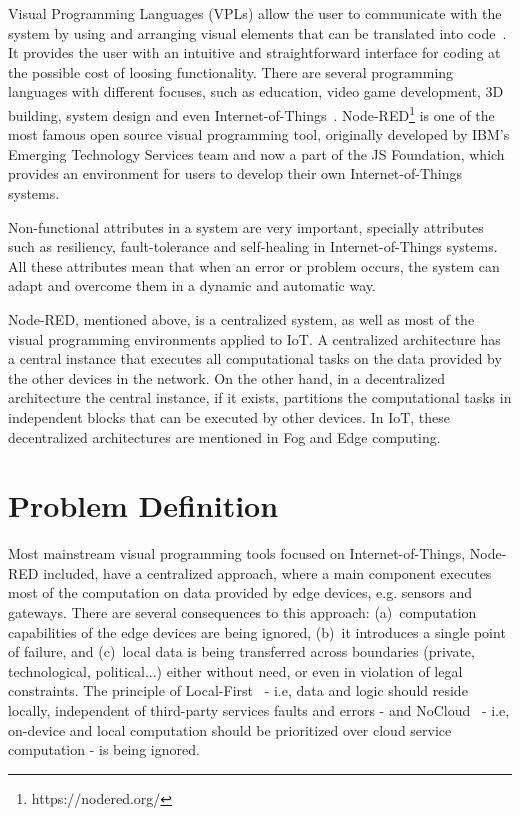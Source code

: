 Visual Programming Languages (VPLs) allow the user to communicate with the system by using and arranging visual elements that can be translated into code~\cite{vpl-book}. It provides the user with an intuitive and straightforward interface for coding at the possible cost of loosing functionality. There are several programming languages with different focuses, such as education, video game development, 3D building, system design and even Internet-of-Things~\cite{survey_vpl_iot}. Node-RED\footnote{https://nodered.org/} is one of the most famous open source visual programming tool, originally developed by IBM’s Emerging Technology Services team and now a part of the JS Foundation, which provides an environment for users to develop their own Internet-of-Things systems.

Non-functional attributes in a system are very important, specially attributes such as resiliency, fault-tolerance and self-healing in Internet-of-Things systems. All these attributes mean that when an error or problem occurs, the system can adapt and overcome them in a dynamic and automatic way.

Node-RED, mentioned above, is a centralized system, as well as most of the visual programming environments applied to IoT. A centralized architecture has a central instance that executes all computational tasks on the data provided by the other devices in the network. On the other hand, in a decentralized architecture the central instance, if it exists, partitions the computational tasks in independent blocks that can be executed by other devices. In IoT, these decentralized architectures are mentioned in Fog and Edge computing.

\section{Problem Definition} \label{sec:problem_definition}

Most mainstream visual programming tools focused on Internet-of-Things, Node-RED included, have a centralized approach, where a main component executes most of the computation on data provided by edge devices, e.g. sensors and gateways. There are several consequences to this approach: (a)~computation capabilities of the edge devices are being ignored, (b)~it introduces a single point of failure, and (c)~local data is being transferred across boundaries (private, technological, political...) either without need, or even in violation of legal constraints. The principle of Local-First~\cite{localfist} - i.e, data and logic should reside locally, independent of third-party services faults and errors - and NoCloud~\cite{nocloud} - i.e, on-device and local computation should be prioritized over cloud service computation - is being ignored. 

